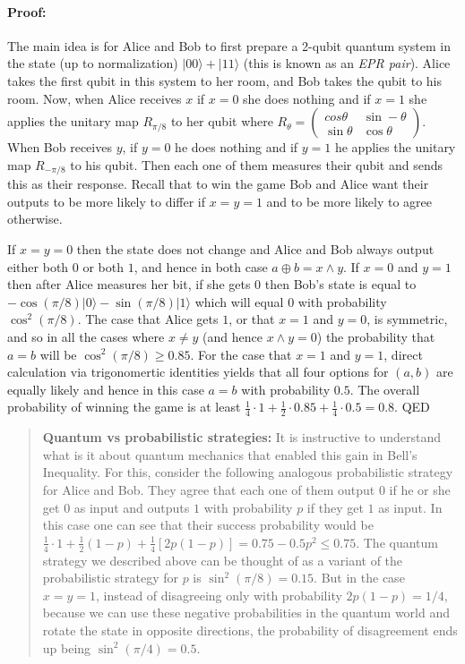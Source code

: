 \paragraph{Proof:} The main idea is for Alice and Bob to first prepare a
2-qubit quantum system in the state (up to normalization)
\(|00\rangle+|11\rangle\) (this is known as an \emph{EPR pair}). Alice
takes the first qubit in this system to her room, and Bob takes the
qubit to his room. Now, when Alice receives \(x\) if \(x=0\) she does
nothing and if \(x=1\) she applies the unitary map \(R_{\pi/8}\) to her
qubit where
\(R_\theta = \begin{pmatrix} cos \theta & \sin -\theta \\ \sin \theta & \cos \theta \end{pmatrix}\).
When Bob receives \(y\), if \(y=0\) he does nothing and if \(y=1\) he
applies the unitary map \(R_{-\pi/8}\) to his qubit. Then each one of
them measures their qubit and sends this as their response. Recall that
to win the game Bob and Alice want their outputs to be more likely to
differ if \(x=y=1\) and to be more likely to agree otherwise.

If \(x=y=0\) then the state does not change and Alice and Bob always
output either both \(0\) or both \(1\), and hence in both case
\(a\oplus b = x \wedge y\). If \(x=0\) and \(y=1\) then after Alice
measures her bit, if she gets \(0\) then Bob's state is equal to
\(-\cos (\pi/8)|0\rangle-\sin(\pi/8)|1\rangle\) which will equal \(0\)
with probability \(\cos^2 (\pi/8)\). The case that Alice gets \(1\), or
that \(x=1\) and \(y=0\), is symmetric, and so in all the cases where
\(x\neq y\) (and hence \(x \wedge y=0\)) the probability that \(a=b\)
will be \(\cos^2(\pi/8) \geq 0.85\). For the case that \(x=1\) and
\(y=1\), direct calculation via trigonomertic identities yields that all
four options for \((a,b)\) are equally likely and hence in this case
\(a=b\) with probability \(0.5\). The overall probability of winning the
game is at least
\(\tfrac{1}{4}\cdot 1 + \tfrac{1}{2}\cdot 0.85 + \tfrac{1}{4} \cdot 0.5 =0.8\).
QED

\begin{quote}
\textbf{Quantum vs probabilistic strategies:} It is instructive to
understand what is it about quantum mechanics that enabled this gain in
Bell's Inequality. For this, consider the following analogous
probabilistic strategy for Alice and Bob. They agree that each one of
them output \(0\) if he or she get \(0\) as input and outputs \(1\) with
probability \(p\) if they get \(1\) as input. In this case one can see
that their success probability would be
\(\tfrac{1}{4}\cdot 1 + \tfrac{1}{2}(1-p)+\tfrac{1}{4}[2p(1-p)]=0.75 -0.5p^2 \leq 0.75\).
The quantum strategy we described above can be thought of as a variant
of the probabilistic strategy for \(p\) is \(\sin^2 (\pi/8)=0.15\). But
in the case \(x=y=1\), instead of disagreeing only with probability
\(2p(1-p)=1/4\), because we can use these negative probabilities in the
quantum world and rotate the state in opposite directions, the
probability of disagreement ends up being \(\sin^2 (\pi/4)=0.5\).
\end{quote}


